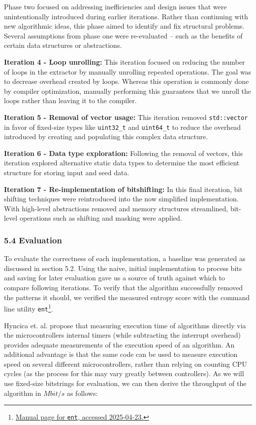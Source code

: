 \documentclass{sigchi}
\begin{document}
Phase two focused on addressing inefficiencies and design issues that were unintentionally introduced during earlier iterations. Rather than continuing with new algorithmic ideas, this phase aimed to identify and fix structural problems. Several assumptions from phase one were re-evaluated -- such as the benefits of certain data structures or abstractions.

\textbf{Iteration 4 - Loop unrolling:} This iteration focused on reducing the number of loops in the extractor by manually unrolling repeated operations. The goal was to decrease overhead created by loops. Whereas this operation is commonly done by compiler optimization, manually performing this guarantees that we unroll the loops rather than leaving it to the compiler.

\textbf{Iteration 5 - Removal of vector usage:} This iteration removed \texttt{std::vector} in favor of fixed-size types like \texttt{uint32\_t} and \texttt{uint64\_t} to reduce the overhead introduced by creating and populating this complex data structure.

\textbf{Iteration 6 - Data type exploration:} Following the removal of vectors, this iteration explored alternative static data types to determine the most efficient structure for storing input and seed data.

\textbf{Iteration 7 - Re-implementation of bitshifting:} In this final iteration, bit shifting techniques were reintroduced into the now simplified implementation. With high-level abstractions removed and memory structures streamlined, bit-level operations such as shifting and masking were applied.

\subsubsection{5.4 Evaluation}\label{evaluation}

To evaluate the correctness of each implementation, a baseline was generated as discussed in section 5.2. Using the naive, initial implementation to process bits and saving for later evaluation gave us a source of truth against which to compare following iterations. To verify that the algorithm successfully removed the patterns it should, we verified the measured entropy score with the command line utility \texttt{ent}\footnote{\href{https://manpages.ubuntu.com/manpages/trusty/man1/ent.1.html}{Manual page for \texttt{ent}, accessed 2025-04-23.}}.

Hyncica et. al. \cite{micromeasurements} propose that measuring execution time of algorithms directly via the microcontrollers internal timers (while subtracting the interrupt overhead) provides adequate measurements of the execution speed of an algorithm. An additional advantage is that the same code can be used to measure execution speed on several different microcontrollers, rather than relying on counting CPU cycles (as the process for this may vary greatly between controllers). As we will use fixed-size bitstrings for evaluation, we can then derive the throughput of the algorithm in \(Mbit/s\) as follows:
\end{document}
